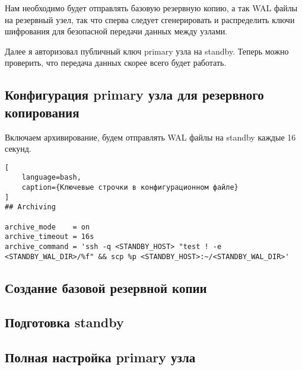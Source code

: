 \documentclass{article}
\begin{document}
Нам необходимо будет отправлять базовую резервную копию, а так WAL файлы на резервный узел, так что сперва следует сгенерировать и распределить ключи шифрования для безопасной передачи данных между узлами.



Далее я авторизовал публичный ключ primary узла на standby. Теперь можно проверить, что передача данных скорее всего будет работать.



\subsection{Конфигурация primary узла для резервного копирования}

Включаем архивирование, будем отправлять WAL файлы на standby каждые 16 секунд.

\begin{lstlisting}[
    language=bash, 
    caption={Ключевые строчки в конфигурационном файле}
]
## Archiving

archive_mode    = on
archive_timeout = 16s
archive_command = 'ssh -q <STANDBY_HOST> "test ! -e <STANDBY_WAL_DIR>/%f" && scp %p <STANDBY_HOST>:~/<STANDBY_WAL_DIR>'
\end{lstlisting}

\subsection{Создание базовой резервной копии}



\subsection{Подготовка standby}



\subsection{Полная настройка primary узла}


\end{document}
